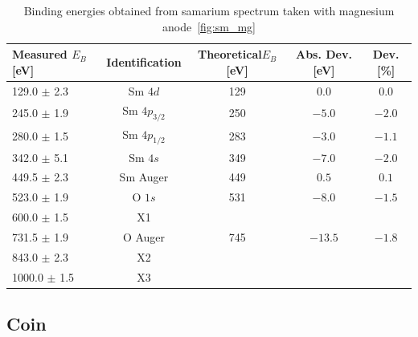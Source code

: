 \documentclass[a4paper,10pt]{scrartcl}
\begin{document}
\begin{table}
\begin{center}
\begin{tabular}{lcccc}
\toprule
Measured $E_{B}$ [eV]      & Identification & Theoretical$E_{B}$ [eV] & Abs. Dev. [eV] & Dev. [\%]\\
\midrule
\phantom{0}129.0 $\pm$ 2.3 & Sm $4d$        & 129                     & $0.0$          & $0.0$ \\
\phantom{0}245.0 $\pm$ 1.9 & Sm $4p_{3/2}$  & 250                     & $-5.0$         & $-2.0$\\
\phantom{0}280.0 $\pm$ 1.5 & Sm $4p_{1/2}$  & 283                     & $-3.0$         & $-1.1$\\
\phantom{0}342.0 $\pm$ 5.1 & Sm $4s$        & 349                     & $-7.0$         & $-2.0$\\
\phantom{0}449.5 $\pm$ 2.3 & Sm Auger       & 449                     & $0.5$          & $0.1$ \\
\phantom{0}523.0 $\pm$ 1.9 & O $1s$         & 531                     & $-8.0$         & $-1.5$\\
\phantom{0}600.0 $\pm$ 1.5 & X1             &                         &                &       \\
\phantom{0}731.5 $\pm$ 1.9 & O Auger        & 745                     & $-13.5$        & $-1.8$\\
\phantom{0}843.0 $\pm$ 2.3 & X2             &                         &                &       \\
1000.0 $\pm$ 1.5           & X3             &                         &                &       \\
\bottomrule
\end{tabular}
\end{center}
\par
\caption{Binding energies obtained from samarium spectrum taken with magnesium anode~\ref{fig:sm_mg} \label{tab:sm_mg_ident}}
\end{table}

\subsection{Coin}
\end{document}
